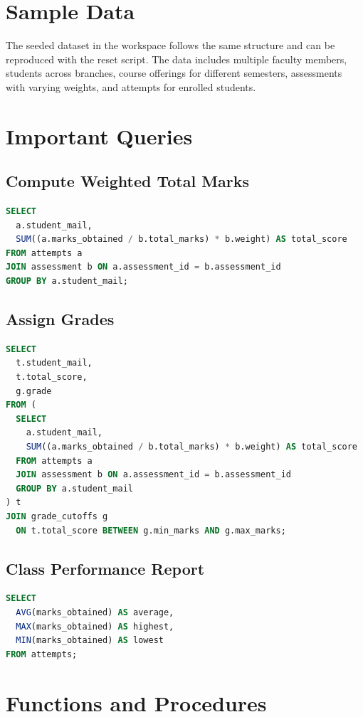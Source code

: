 \documentclass[12pt,a4paper]{report}
\begin{document}
\section{Sample Data}
The seeded dataset in the workspace follows the same structure and can be reproduced with the reset script. The data includes multiple faculty members, students across branches, course offerings for different semesters, assessments with varying weights, and attempts for enrolled students.

\section{Important Queries}
\subsection{Compute Weighted Total Marks}
\begin{lstlisting}[language=SQL]
SELECT
  a.student_mail,
  SUM((a.marks_obtained / b.total_marks) * b.weight) AS total_score
FROM attempts a
JOIN assessment b ON a.assessment_id = b.assessment_id
GROUP BY a.student_mail;
\end{lstlisting}

\subsection{Assign Grades}
\begin{lstlisting}[language=SQL]
SELECT
  t.student_mail,
  t.total_score,
  g.grade
FROM (
  SELECT
    a.student_mail,
    SUM((a.marks_obtained / b.total_marks) * b.weight) AS total_score
  FROM attempts a
  JOIN assessment b ON a.assessment_id = b.assessment_id
  GROUP BY a.student_mail
) t
JOIN grade_cutoffs g
  ON t.total_score BETWEEN g.min_marks AND g.max_marks;
\end{lstlisting}

\subsection{Class Performance Report}
\begin{lstlisting}[language=SQL]
SELECT
  AVG(marks_obtained) AS average,
  MAX(marks_obtained) AS highest,
  MIN(marks_obtained) AS lowest
FROM attempts;
\end{lstlisting}

\section{Functions and Procedures}
\end{document}
